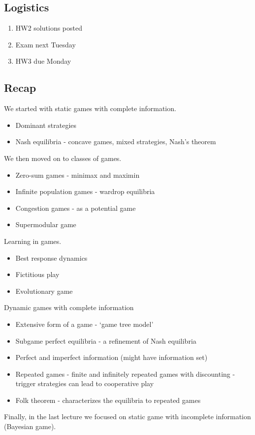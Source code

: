 \newsection
\subsection*{Logistics}
\begin{enumerate}
    \item HW2 solutions posted
    \item Exam next Tuesday
    \item HW3 due Monday
\end{enumerate}

\subsection*{Recap}
We started with static games with complete information. \begin{itemize}
    \item Dominant strategies
    \item Nash equilibria - concave games, mixed strategies, Nash's theorem
\end{itemize}
We then moved on to classes of games.
\begin{itemize}
    \item Zero-sum games - minimax and maximin
    \item Infinite population games - wardrop equilibria
    \item Congestion games - as a potential game
    \item Supermodular game
\end{itemize}
Learning in games.
\begin{itemize}
    \item Best response dynamics
    \item Fictitious play
    \item Evolutionary game
\end{itemize}
Dynamic games with complete information \begin{itemize}
    \item Extensive form of a game - `game tree model'
    \item Subgame perfect equilibria - a refinement of Nash equilibria
    \item Perfect and imperfect information (might have information set)
    \item Repeated games - finite and infinitely repeated games with discounting - trigger strategies can lead to cooperative play
    \item Folk theorem - characterizes the equilibria to repeated games
\end{itemize}
Finally, in the last lecture we focused on static game with incomplete information (Bayesian game).

